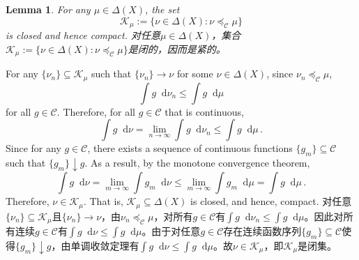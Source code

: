 \documentclass[12pt,letterpaper]{article}
\makeatletter
\newenvironment{original}{\color{black}}{}
\newenvironment{translation}{\color{blue}}{}
\theoremstyle{plain}
\newtheorem{lemma}{Lemma}
\theoremstyle{definition}
\renewenvironment{proof}[1][\proofname]{
  \par\pushQED{\qed}\normalfont
  \topsep6\p@\@plus6\p@\relax
  \trivlist\item[\hskip\labelsep\bfseries#1\@addpunct{.}]
  \ignorespaces
}{
  \popQED\endtrivlist\@endpefalse
}
\theoremstyle{remark}
\newcommand{\C}{\mathcal{C}}
\newcommand{\K}{\mathcal{K}}
\renewcommand*\d{\mathop{}\!\mathrm{d}}
\theoremstyle{definition}
\makeatother
\begin{document}
\begin{lemma}\label{lem:compactK}
\begin{original}
For any $\mu \in \Delta(X)$, the set
\[\K_\mu:= \Big\{\nu \in \Delta(X):  \nu \preceq_\C \mu\Big\}\]
is closed and hence compact.
\end{original}
\begin{translation}
对任意$\mu \in \Delta(X)$，集合$\K_\mu:= \{\nu \in \Delta(X): \nu \preceq_\C \mu\}$是闭的，因而是紧的。
\end{translation}
\end{lemma}

\begin{proof}
\begin{original}
For any $\{\nu_n\} \subseteq \mathcal{K}_\mu$ such that $\{\nu_n\} \to \nu$ for some $\nu \in \Delta(X)$, since $\nu_n \preceq_\C \mu$,
\[
\int g \d \nu_n \leq \int g \d \mu
\]
for all $g \in \C$. Therefore, for all $g \in \C$ that is continuous,
\[
\int g \d \nu =\lim_{n \to \infty} \int g \d \nu_n \leq \int g \d \mu\,.
\]
Since for any $g \in \C$, there exists a sequence of continuous functions $\{g_m\} \subseteq \C$ such that $\{g_m\} \downarrow g$. As a result, by the monotone convergence theorem,
\[
\int g \d \nu=\lim_{m \to \infty} \int g_m \d \nu \leq \lim_{m \to \infty} \int g_m \d \mu=\int g \d \mu\,.
\]
Therefore, $\nu \in \mathcal{K}_\mu$. That is, $\mathcal{K}_\mu\subseteq \Delta(X)$ is closed, and hence, compact.
\end{original}
\begin{translation}
对任意$\{\nu_n\} \subseteq \mathcal{K}_\mu$且$\{\nu_n\} \to \nu$，由$\nu_n \preceq_\C \mu$，对所有$g \in \C$有$\int g \d \nu_n \leq \int g \d \mu$。因此对所有连续$g \in \C$有$\int g \d \nu \leq \int g \d \mu$。由于对任意$g \in \C$存在连续函数序列$\{g_m\} \subseteq \C$使得$\{g_m\} \downarrow g$，由单调收敛定理有$\int g \d \nu \leq \int g \d \mu$。故$\nu \in \mathcal{K}_\mu$，即$\mathcal{K}_\mu$是闭集。
\end{translation}
\end{proof}

\end{document}
